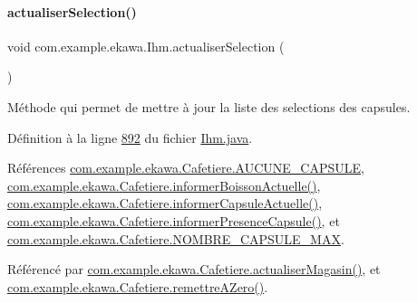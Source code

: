 \paragraph{\texorpdfstring{actualiser\+Selection()}{actualiserSelection()}}
{\footnotesize\ttfamily void com.\+example.\+ekawa.\+Ihm.\+actualiser\+Selection (\begin{DoxyParamCaption}{ }\end{DoxyParamCaption})}



Méthode qui permet de mettre à jour la liste des selections des capsules. 



Définition à la ligne \hyperlink{_ihm_8java_source_l00892}{892} du fichier \hyperlink{_ihm_8java_source}{Ihm.\+java}.



Références \hyperlink{_cafetiere_8java_source_l00028}{com.\+example.\+ekawa.\+Cafetiere.\+A\+U\+C\+U\+N\+E\+\_\+\+C\+A\+P\+S\+U\+LE}, \hyperlink{_cafetiere_8java_source_l00245}{com.\+example.\+ekawa.\+Cafetiere.\+informer\+Boisson\+Actuelle()}, \hyperlink{_cafetiere_8java_source_l00235}{com.\+example.\+ekawa.\+Cafetiere.\+informer\+Capsule\+Actuelle()}, \hyperlink{_cafetiere_8java_source_l00316}{com.\+example.\+ekawa.\+Cafetiere.\+informer\+Presence\+Capsule()}, et \hyperlink{_cafetiere_8java_source_l00029}{com.\+example.\+ekawa.\+Cafetiere.\+N\+O\+M\+B\+R\+E\+\_\+\+C\+A\+P\+S\+U\+L\+E\+\_\+\+M\+AX}.



Référencé par \hyperlink{_cafetiere_8java_source_l00561}{com.\+example.\+ekawa.\+Cafetiere.\+actualiser\+Magasin()}, et \hyperlink{_cafetiere_8java_source_l00658}{com.\+example.\+ekawa.\+Cafetiere.\+remettre\+A\+Zero()}.


